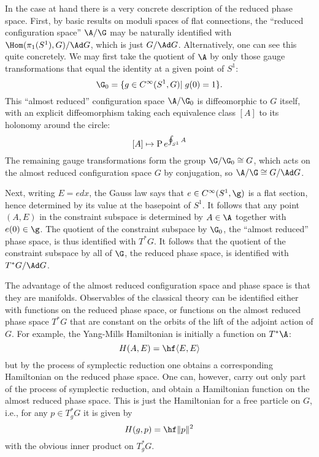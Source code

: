 In the case at hand there is a very concrete description of the reduced
phase space.  First, by basic results on moduli spaces of flat
connections, the ``reduced configuration space''
$\A/\G$ may be naturally identified with $\Hom(\pi_1(S^1),G)/\Ad G$, which
is just $G/\Ad G$.   Alternatively, one can see this quite concretely.
We may first take the quotient of $\A$
by only those gauge transformations that equal the identity at a given point
of $S^1$:
\[      \G_0 = \{ g \in C^\infty(S^1,G) | \; g(0) = 1 \}.\]
This ``almost reduced'' configuration space
$\A/\G_0$ is diffeomorphic to $G$ itself, with an
explicit diffeomorphism taking each equivalence class
$[A]$ to its holonomy around the circle:
\[         [A] \mapsto {\rm P}\, e^{ \oint_{S^1} A } \]
The remaining gauge transformations form the group $\G/\G_0 \cong G$,
which acts on the almost reduced configuration space $G$ by conjugation, so
$\A/\G \cong G/\Ad G$.

Next, writing $E = edx$, the Gauss law says that $e \in C^\infty(S^1,\g)$
is a flat section, hence determined by its value at the basepoint of $S^1$.
It follows that any point $(A,E)$ in the constraint subspace is determined
by $A \in \A$ together with $e(0) \in \g$.  The quotient of the constraint
subspace by $\G_0$, the ``almost reduced'' phase space, is thus identified
with $T^\ast G$.  It follows that the quotient of the constraint subspace
by all of $\G$, the reduced phase space, is identified with $T^\ast
G/\Ad G$.

The advantage of the almost reduced configuration space and phase space is
that they are manifolds.  Observables of the classical theory can be
identified either with functions on the reduced phase space, or functions
on the almost reduced phase space $T^\ast G$ that are constant on the
orbits of the lift of the adjoint action of $G$.
For example, the Yang-Mills Hamiltonian is initially a function on $T^\ast \A$:
\[       H(A,E) = \hf  \langle E,E\rangle  \]
but by the process of symplectic reduction one obtains a corresponding
Hamiltonian on the reduced phase space.   One can, however,
carry out only part of the process of symplectic
reduction, and obtain a Hamiltonian function on the almost reduced phase
space.     This is just the Hamiltonian for a free particle
on $G$, i.e., for any $p \in T^\ast_g G$ it is given by
\[        H(g,p) = \hf \|p\|^2  \]
with the obvious inner product on $T^\ast_g G$.

